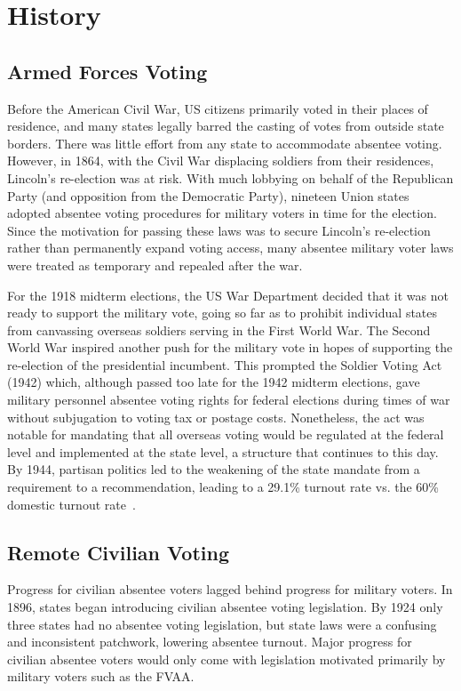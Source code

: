 \section{History}
\subsection{Armed Forces Voting}
Before the American Civil War, US citizens primarily voted in their
places of residence, and many states legally barred the casting of
votes from outside state borders. There was little effort from any
state to accommodate absentee voting. However, in 1864, with the Civil
War displacing soldiers from their residences, Lincoln's re-election
was at risk. With much lobbying on behalf of the Republican Party (and
opposition from the Democratic Party), nineteen Union states adopted
absentee voting procedures for military voters in time for the
election. Since the motivation for passing these laws was to secure
Lincoln's re-election rather than permanently expand voting access,
many absentee military voter laws were treated as temporary and
repealed after the war.

For the 1918 midterm elections, the US War Department decided that it
was not ready to support the military vote, going so far as to
prohibit individual states from canvassing overseas soldiers serving
in the First World War. The Second World War inspired another push for
the military vote in hopes of supporting the re-election of the
presidential incumbent. This prompted the Soldier Voting Act (1942)
which, although passed too late for the 1942 midterm elections, gave
military personnel absentee voting rights for federal elections during
times of war without subjugation to voting tax or postage
costs. Nonetheless, the act was notable for mandating that all
overseas voting would be regulated at the federal level and
implemented at the state level, a structure that continues to this
day. By 1944, partisan politics led to the weakening of the state
mandate from a requirement to a recommendation, leading to a 29.1\%
turnout rate vs. the 60\% domestic turnout rate~\cite{smith2015}.



\subsection{Remote Civilian Voting}

Progress for civilian absentee voters lagged behind progress for
military voters. In 1896, states began introducing civilian absentee
voting legislation. By 1924 only three states had no absentee voting
legislation, but state laws were a confusing and inconsistent
patchwork, lowering absentee turnout. Major progress for civilian
absentee voters would only come with legislation motivated primarily
by military voters such as the FVAA.

